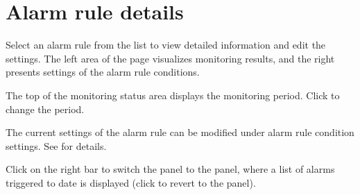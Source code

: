 \documentclass[letterpaper,10pt,english]{sphinxmanual}
\begin{document}
\section{Alarm rule details}
\label{\detokenize{anomaly/part04/index:alarm-rule-details}}\label{\detokenize{anomaly/part04/index:id3}}
Select an alarm rule from the list to view detailed information and edit the settings. The left area of the page visualizes monitoring results, and the right presents settings of the alarm rule conditions.
\begin{quote}

\begin{figure}[H]
\centering

\noindent{}
\end{figure}
\end{quote}

The top of the monitoring status area displays the monitoring period. Click  to change the period.
\begin{quote}

\begin{figure}[H]
\centering

\noindent{}
\end{figure}
\end{quote}

The current settings of the alarm rule can be modified under alarm rule condition settings. See {\hyperref[\detokenize{anomaly/part02/index:alarm-rule-settings}]{}} for details.
\begin{quote}

\begin{figure}[H]
\centering

\noindent{}
\end{figure}
\end{quote}

Click  on the right bar to switch the  panel to the  panel, where a list of alarms triggered to date is displayed (click  to revert to the  panel).
\begin{quote}

\begin{figure}[H]
\centering

\noindent{}
\end{figure}
\end{quote}
\end{document}
